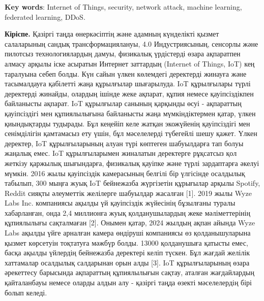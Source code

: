 {\bfseries Key words}: Internet of Things, security, network attack,
machine learning, federated learning, DDoS.
\begin{multicols}{2}

{\bfseries Кіріспе.} Қазіргі таңда өнеркәсіптің және адамның күнделікті
қызмет салаларының сандық трансформациялануы, 4.0 Индустриясының,
сенсорлы және пилотсыз технологиялардың дамуы, физикалық үрдістерді
өзара ақпаратпен алмасу арқылы іске асыратын Интернет заттардың
(Internet of Things, IoT) кең таралуына себеп болды. Күн сайын үлкен
көлемдегі деректерді жинауға және тасымалдауға қабілетті жаңа құрылғылар
шығарылуда. IoT құрылғылары түрлі деректерді жинайды, олардың ішінде
жеке ақпарат, құпия немесе қауіпсіздікпен байланысты ақпарат. IoT
құрылғылар санының қарқынды өсуі - ақпараттың қауіпсіздігі мен
құпиялылығына байланысты жаңа мүмкіндіктермен қатар, үлкен қиындықтарды
тудырады. Бұл кеңейіп келе жатқан экожүйенің қауіпсіздігі мен
сенімділігін қамтамасыз ету үшін, бұл мәселелерді түбегейлі шешу қажет.
Үлкен деректер, IoT құрылғыларының алуан түрі көптеген шабуылдарға тап
болуы жаңалық емес. IoT құрылғыларымен жиналатын деректерге рұқсатсыз
қол жеткізу қаржылық шығындарға, физикалық қауіпке және түрлі
зардаптарға әкелуі мүмкін. 2016 жылы қауіпсіздік камерасының белгілі бір
үлгісінде осалдылық табылып, 300 мыңға жуық IoT бейнежазба жүргізетін
құрығылар арқылы Spotify, Reddit сияқты әлеуметтік желілерге шабуылдар
жасалған {[}1{]}. 2019 жылы Wyze Labs Inc. компаниясы ақылды үй
қауіпсіздік жүйесінің бұзылғаны туралы хабарланған, онда 2,4 миллионға
жуық қолданушылардың жеке мәліметтерінің құпиялылығы сақталмаған
{[}2{]}. Онымен қатар, 2024 жылдың ақпан айында Wyze Labs ақылды үйге
арналған камера өндіруші компаниясы өз қолданышуларына қызмет көрсетуін
тоқтатуға мәжбүр болды. 13000 қолданушыға қатысты емес, басқа ақылды
үйлердің бейнежазба деректері келіп түскен. Бұл жағдай желілік
хаттамалар осалдылық салдарынан орын алды {[}3{]}. IoT құрылғыларының
өзара әрекеттесу барысында ақпараттың құпиялылығын сақтау, аталған
жағдайлардың қайталанбауы немесе оларды алдын алу - қазіргі таңда өзекті
мәселелердің бірі болып келеді.


\end{multicols}

